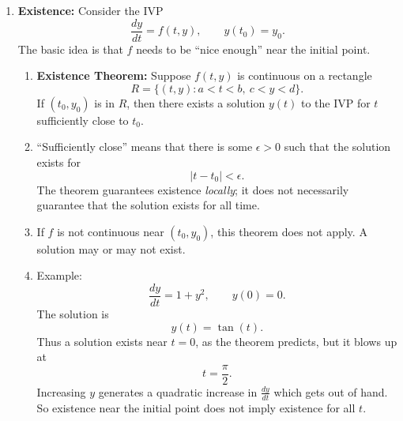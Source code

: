 \documentclass{article}
\begin{document}
\begin{enumerate}
Consider the differential equation
\[
\frac{dy}{dt}=y(1-y).
\]

There are two equilibrium solutions:
\[
y(t)=0,\qquad y(t)=1.
\]

Suppose a solution starts at $y(0)=\frac12$. Since
\[
y(1-y)>0\qquad\text{for }0<y<1,
\]
the solution initially increases.

\begin{quote}
Could this solution ever cross $y=1$?
\end{quote}

If it did, at the moment it reached $y=1$ there would be two different solutions through the same point: our solution and the equilibrium solution $y=1$.

Thus, if solutions are unique, \textbf{solution curves cannot cross}. In particular,
\[
0<y(t)<1
\]
for all $t$ for which the solution exists.

This illustrates the practical importance of uniqueness: it lets us draw conclusions about the behavior of solutions without solving the differential equation.

\item \textbf{Existence:} Consider the IVP
\[
\frac{dy}{dt}=f(t,y),\qquad y(t_0)=y_0.
\]
The basic idea is that $f$ needs to be ``nice enough'' near the initial point.
\begin{enumerate}
    \item \textbf{Existence Theorem:} Suppose $f(t,y)$ is continuous on a rectangle
    \[
    R=\{(t,y):a<t<b,\ c<y<d\}.
    \]
    If $(t_0,y_0)$ is in $R$, then there exists a solution $y(t)$ to the IVP for $t$ sufficiently close to $t_0$.

    \item ``Sufficiently close'' means that there is some $\epsilon>0$ such that the solution exists for
    \[
    |t-t_0|<\epsilon.
    \]
    The theorem guarantees existence \emph{locally}; it does not necessarily guarantee that the solution exists for all time.

    \item If $f$ is not continuous near $(t_0,y_0)$, this theorem does not apply. A solution may or may not exist.

    \item Example:
    \[
    \frac{dy}{dt}=1+y^2,\qquad y(0)=0.
    \]
    The solution is
    \[
    y(t)=\tan(t).
    \]
    Thus a solution exists near $t=0$, as the theorem predicts, but it blows up at
    \[
    t=\frac{\pi}{2}.
    \]
    Increasing $y$ generates a quadratic increase in $\frac{dy}{dt}$ which gets out of hand.
    So existence near the initial point does not imply existence for all $t$.
\end{enumerate}


\end{enumerate}
\end{document}
